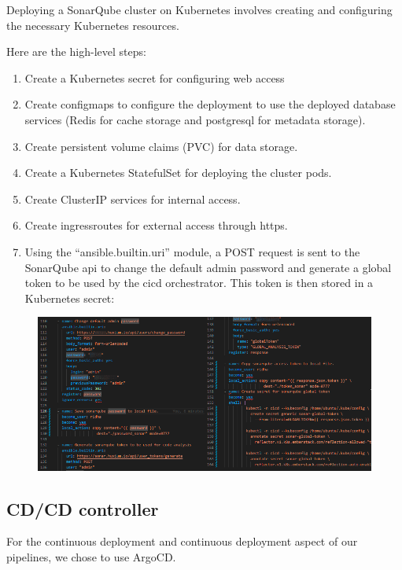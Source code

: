 Deploying a SonarQube cluster on Kubernetes involves creating and configuring the necessary Kubernetes resources. 

Here are the high-level steps: 
\begin{enumerate}
\item Create a Kubernetes secret for configuring web access 
\item Create configmaps to configure the deployment to use the deployed database services (Redis for cache storage and postgresql for metadata storage). 
\item Create persistent volume claims (PVC) for data storage. 
\item Create a Kubernetes StatefulSet for deploying the cluster pods. 
\item Create ClusterIP services for internal access. 
\item Create ingressroutes for external access through https. 
\item Using the “ansible.builtin.uri” module, a POST request is sent to the SonarQube api to change the default admin password and generate a global token to be used by the cicd orchestrator. This token is then stored in a Kubernetes secret: 
\end{enumerate}

\begin{figure}[H]\centering
\includegraphics[width=1.0\textwidth,angle=00]{assets/f42.png}
\end{figure}

\subsection{CD/CD controller }

For the continuous deployment and continuous deployment aspect of our pipelines, we chose to use ArgoCD. 

